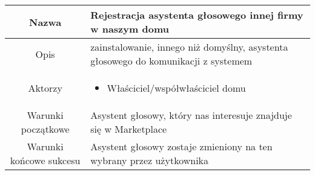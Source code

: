 \documentclass{article}
\begin{document}
\begin{enumerate}
\begin{enumerate}
				\begin{table}[H]
					\centering
					\begin{tabular}{|c|p{7cm}|}
						\hline
						Nazwa                   & \textbf{Rejestracja asystenta głosowego innej firmy w naszym domu}                                                                                                                                                                                                                                                                                                                                 \\
						\hline
						Opis                    & zainstalowanie, innego niż domyślny, asystenta głosowego do komunikacji z systemem                                                                                                                                                                                                                                                                                                                 \\
						\hline
						Aktorzy                 & \begin{itemize}\item Właściciel/współwłaściciel domu\end{itemize}                                                                                                                                                                                                                                                                                                                                  \\
						\hline
						Warunki początkowe      & Asystent głosowy, który nas interesuje znajduje się w Marketplace                                                                                                                                                                                                                                                                                                                                  \\
						\hline
						Warunki końcowe sukcesu & Asystent głosowy zostaje zmieniony na ten wybrany przez użytkownika                                                                                                                                                                                                                                                                                                                                \\

\end{tabular}
\end{table}
\end{enumerate}
\end{enumerate}
\end{document}
